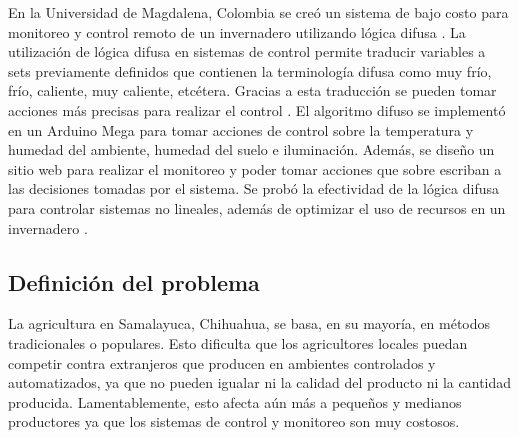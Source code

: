 \documentclass[final,12pt]{article}
\begin{document}
En la Universidad de Magdalena, Colombia se creó un sistema de bajo costo para monitoreo y control remoto de un invernadero utilizando lógica difusa \cite{low_cost_fuzzy_logic_greenhouse}. La utilización de lógica difusa en sistemas de control permite traducir variables a sets previamente definidos que contienen la 
terminología difusa como muy frío, frío, caliente, muy caliente, etcétera. Gracias a esta traducción se pueden tomar acciones más precisas para realizar el control \cite{agriculture_automation_review}. El algoritmo difuso se implementó en un Arduino Mega para tomar acciones de control sobre la temperatura y humedad del ambiente, humedad del suelo e iluminación. Además, se diseño un sitio web para realizar el monitoreo y poder tomar acciones que sobre escriban a las decisiones tomadas por el sistema. Se probó la efectividad de la lógica difusa para controlar sistemas no lineales, además de optimizar el uso de recursos en un invernadero \cite{low_cost_fuzzy_logic_greenhouse}.



\newpage
\subsection{Definición del problema}


La agricultura en Samalayuca, Chihuahua, se basa, en su mayoría, en métodos tradicionales o populares. Esto dificulta que los agricultores
locales puedan competir contra extranjeros que producen en ambientes controlados y automatizados, ya que no pueden igualar ni la calidad 
del producto ni la cantidad producida. Lamentablemente, esto afecta aún más a pequeños y medianos productores ya que los sistemas de control 
y monitoreo son muy costosos.


\end{document}

